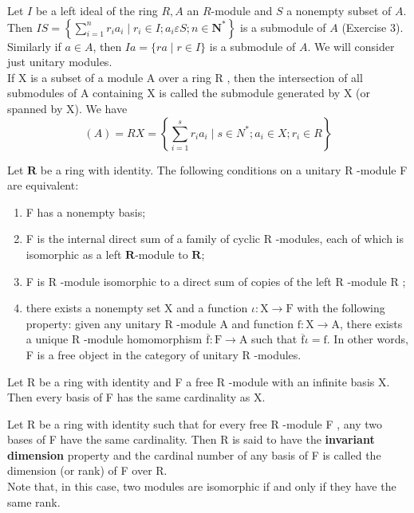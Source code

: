 Let $I$ be a left ideal of the ring $R, A$ an $R$-module and $S$ a nonempty subset of $A$. Then $I S=\left\{\sum_{i=1}^n r_i a_i \mid r_i \in I ; a_i \varepsilon S ; n \in \mathbf{N}^*\right\}$ is a submodule of $A$ (Exercise 3). Similarly if $a \in A$, then $I a=\{r a \mid r \in I\}$ is a submodule of $A$. We will consider just unitary modules.\\

If X is a subset of a module A over a ring R , then the intersection of all submodules of A containing X is called the submodule generated by X (or spanned by X). We have $$(A)=R X=\left\{\sum_{i=1}^s r_i a_i \mid s \in N^* ; a_i \in X ; r_i \in R\right\}$$

\begin{theo} Let $\mathbf{R}$ be a ring with identity. The following conditions on a unitary R -module F are equivalent:
    \begin{enumerate}
        \item F has a nonempty basis;
        \item F is the internal direct sum of a family of cyclic R -modules, each of which is isomorphic as a left $\mathbf{R}$-module to $\mathbf{R}$;
        \item F is R -module isomorphic to a direct sum of copies of the left R -module R ;
        \item there exists a nonempty set X and a function $\iota: \mathrm{X} \rightarrow \mathrm{F}$ with the following property: given any unitary R -module A and function $\mathrm{f}: \mathrm{X} \rightarrow \mathrm{A}$, there exists a unique R -module homomorphism $\overline{\mathrm{f}}: \mathrm{F} \rightarrow \mathrm{A}$ such that $\overline{\mathrm{f}} \iota=\mathrm{f}$. In other words, F is a free object in the category of unitary R -modules.
    \end{enumerate}
\end{theo}

\begin{theo}
        Let R be a ring with identity and F a free R -module with an infinite basis X. Then every basis of F has the same cardinality as X.
\end{theo}

Let R be a ring with identity such that for every free R -module F , any two bases of F have the same cardinality. Then R is said to have the \textbf{invariant dimension} property and the cardinal number of any basis of F is called the dimension (or rank) of F over R. \\
Note that, in this case, two modules are isomorphic if and only if they have the same rank.\\

